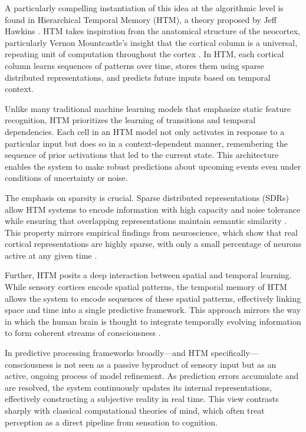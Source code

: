 \documentclass[12pt]{article}
\begin{document}
A particularly compelling instantiation of this idea at the algorithmic level is found in Hierarchical Temporal Memory (HTM), a theory proposed by Jeff Hawkins \cite{hawkins2004onintelligence}. HTM takes inspiration from the anatomical structure of the neocortex, particularly Vernon Mountcastle's insight that the cortical column is a universal, repeating unit of computation throughout the cortex \cite{mountcastle1978mindfulbrain}. In HTM, each cortical column learns sequences of patterns over time, stores them using sparse distributed representations, and predicts future inputs based on temporal context.

Unlike many traditional machine learning models that emphasize static feature recognition, HTM prioritizes the learning of transitions and temporal dependencies. Each cell in an HTM model not only activates in response to a particular input but does so in a context-dependent manner, remembering the sequence of prior activations that led to the current state. This architecture enables the system to make robust predictions about upcoming events even under conditions of uncertainty or noise.

The emphasis on sparsity is crucial. Sparse distributed representations (SDRs) allow HTM systems to encode information with high capacity and noise tolerance while ensuring that overlapping representations maintain semantic similarity \cite{ahmad2015properties}. This property mirrors empirical findings from neuroscience, which show that real cortical representations are highly sparse, with only a small percentage of neurons active at any given time \cite{olshausen1996emergence}.

Further, HTM posits a deep interaction between spatial and temporal learning. While sensory cortices encode spatial patterns, the temporal memory of HTM allows the system to encode sequences of these spatial patterns, effectively linking space and time into a single predictive framework. This approach mirrors the way in which the human brain is thought to integrate temporally evolving information to form coherent streams of consciousness \cite{seth2015prediction}.

In predictive processing frameworks broadly—and HTM specifically—consciousness is not seen as a passive byproduct of sensory input but as an active, ongoing process of model refinement. As prediction errors accumulate and are resolved, the system continuously updates its internal representations, effectively constructing a subjective reality in real time. This view contrasts sharply with classical computational theories of mind, which often treat perception as a direct pipeline from sensation to cognition.
\end{document}
